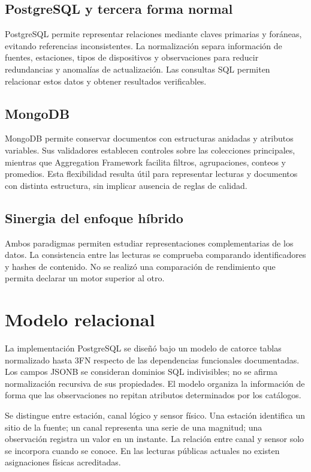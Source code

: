 \documentclass[12pt,letterpaper]{article}
\begin{document}
\subsection{PostgreSQL y tercera forma normal}
PostgreSQL permite representar relaciones mediante claves primarias y foráneas,
evitando referencias inconsistentes. La normalización separa información de
fuentes, estaciones, tipos de dispositivos y observaciones para reducir redundancias
y anomalías de actualización. Las consultas SQL permiten relacionar estos datos
y obtener resultados verificables.

\subsection{MongoDB}
MongoDB permite conservar documentos con estructuras anidadas y atributos
variables. Sus validadores establecen controles sobre las colecciones principales,
mientras que Aggregation Framework facilita filtros, agrupaciones, conteos y
promedios. Esta flexibilidad resulta útil para representar lecturas y documentos
con distinta estructura, sin implicar ausencia de reglas de calidad.

\subsection{Sinergia del enfoque híbrido}
Ambos paradigmas permiten estudiar representaciones complementarias de los datos.
La consistencia entre las lecturas se comprueba comparando identificadores y
hashes de contenido. No se realizó una comparación de rendimiento que permita
declarar un motor superior al otro.

\section{Modelo relacional}

La implementación PostgreSQL se diseñó bajo un modelo de catorce tablas normalizado
hasta 3FN respecto de las dependencias funcionales documentadas. Los campos JSONB
se consideran dominios SQL indivisibles; no se afirma normalización recursiva de
sus propiedades. El modelo organiza la información de forma que las observaciones
no repitan atributos determinados por los catálogos.

Se distingue entre estación, canal lógico y sensor físico. Una estación identifica
un sitio de la fuente; un canal representa una serie de una magnitud; una
observación registra un valor en un instante. La relación entre canal y sensor
solo se incorpora cuando se conoce. En las lecturas públicas actuales no existen
asignaciones físicas acreditadas.
\end{document}
